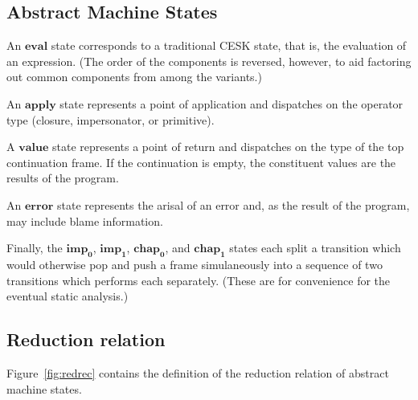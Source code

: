 \subsection{Abstract Machine States}

An $\mathbf{eval}$ state corresponds to a traditional CESK state, that is, the evaluation of an expression.
(The order of the components is reversed, however, to aid factoring out common components from among the variants.)

An $\mathbf{apply}$ state represents a point of application and dispatches on the operator type (closure, impersonator, or primitive).

A $\mathbf{value}$ state represents a point of return and dispatches on the type of the top continuation frame.
If the continuation is empty, the constituent values are the results of the program.

An $\mathbf{error}$ state represents the arisal of an error and, as the result of the program, may include blame information.

Finally, the $\mathbf{imp_0}$, $\mathbf{imp_1}$, $\mathbf{chap_0}$, and $\mathbf{chap_1}$ states each split a transition which would otherwise pop and push a frame simulaneously into a sequence of two transitions which performs each separately.
(These are for convenience for the eventual static analysis.)

\subsection{Reduction relation}

Figure~\ref{fig:redrec} contains the definition of the reduction relation of abstract machine states.




